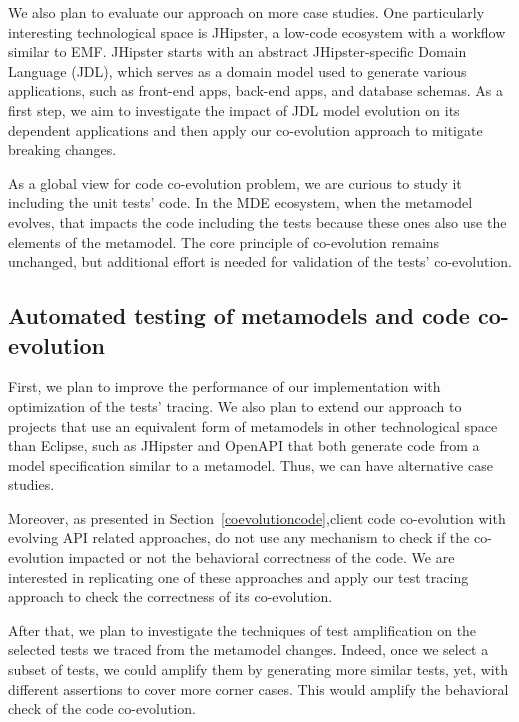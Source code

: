 We also plan to evaluate our approach on more case studies. One particularly interesting technological space is JHipster, a low-code ecosystem with a workflow similar to EMF. JHipster starts with an abstract JHipster-specific Domain Language (JDL), which serves as a domain model used to generate various applications, such as front-end apps, back-end apps, and database schemas. As a first step, we aim to investigate the impact of JDL model evolution on its dependent applications and then apply our co-evolution approach to mitigate breaking changes.

As a global view for code co-evolution problem, we are curious to study it including the unit tests' code. In the MDE ecosystem, when the metamodel evolves, that impacts the code including the tests because these ones also use the elements of the metamodel. The core principle of co-evolution remains unchanged, but additional effort is needed for validation of the tests' co-evolution.
%


%
%


\subsection{Automated testing of metamodels and code co-evolution}
First, we plan to improve the performance of our implementation with optimization of the tests' tracing.  %
We also plan to extend our approach to projects that use an equivalent form of metamodels in other technological space than Eclipse, such as JHipster and OpenAPI that both generate code from a model specification similar to a metamodel. Thus, we can have alternative case studies. 

Moreover, as presented in Section~\ref{coevolutioncode},client code co-evolution with evolving API related approaches, do not use any mechanism to check if the co-evolution impacted or not the behavioral correctness of the code. We are interested in replicating one of these approaches and apply our test tracing approach to check the correctness of its co-evolution.

After that, we plan to investigate the techniques of test amplification on the selected tests we traced from the metamodel changes. Indeed, once we select a subset of tests, we could amplify them by generating more similar tests, yet, with different assertions to cover more corner cases. This would amplify the behavioral check of the code co-evolution. 

